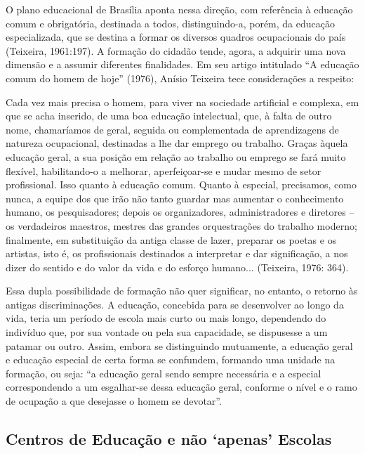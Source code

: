 O plano educacional de Brasília aponta nessa direção, com referência à
educação comum e obrigatória, destinada a todos, distinguindo-a, porém, da educação
especializada, que se destina a formar os diversos quadros ocupacionais do país
(Teixeira, 1961:197). A formação do cidadão tende, agora, a adquirir uma nova
dimensão e a assumir diferentes finalidades. Em seu artigo intitulado “A educação
comum do homem de hoje” (1976), Anísio Teixeira tece considerações a respeito:

\begin{citacao}
    Cada vez mais precisa o homem, para viver na sociedade artificial e
    complexa, em que se acha inserido, de uma boa educação intelectual, que, à
    falta de outro nome, chamaríamos de geral, seguida ou complementada de
    aprendizagens de natureza ocupacional, destinadas a lhe dar emprego ou
    trabalho. Graças àquela educação geral, a sua posição em relação ao
    trabalho ou emprego se fará muito flexível, habilitando-o a melhorar,
    aperfeiçoar-se e mudar mesmo de setor profissional. Isso quanto à educação
    comum. Quanto à especial, precisamos, como nunca, a equipe dos que irão
    não tanto guardar mas aumentar o conhecimento humano, os pesquisadores;
    depois os organizadores, administradores e diretores – os verdadeiros
    maestros, mestres das grandes orquestrações do trabalho moderno;
    finalmente, em substituição da antiga classe de lazer, preparar os poetas e os
    artistas, isto é, os profissionais destinados a interpretar e dar significação, a
    nos dizer do sentido e do valor da vida e do esforço humano... (Teixeira,
    1976: 364).
\end{citacao}

Essa dupla possibilidade de formação não quer significar, no entanto, o retorno
às antigas discriminações. A educação, concebida para se desenvolver ao longo da vida,
teria um período de escola mais curto ou mais longo, dependendo do indivíduo que, por
sua vontade ou pela sua capacidade, se dispusesse a um patamar ou outro. Assim,
embora se distinguindo mutuamente, a educação geral e educação especial de certa
forma se confundem, formando uma unidade na formação, ou seja: “a educação geral
sendo sempre necessária e a especial correspondendo a um esgalhar-se dessa educação
geral, conforme o nível e o ramo de ocupação a que desejasse o homem se devotar”.


\subsection{Centros de Educação e não ‘apenas’ Escolas }

